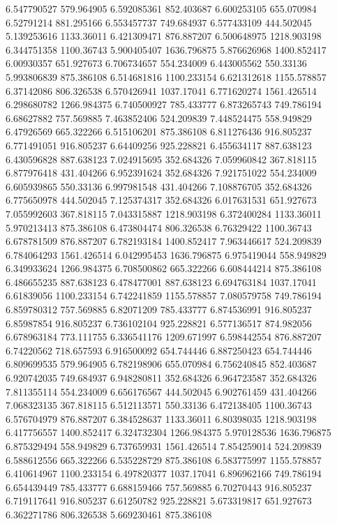 6.547790527	579.964905
6.592085361	852.403687
6.600253105	655.070984
6.52791214	881.295166
6.553457737	749.684937
6.577433109	444.502045
5.139253616	1133.36011
6.421309471	876.887207
6.500648975	1218.903198
6.344751358	1100.36743
5.900405407	1636.796875
5.876626968	1400.852417
6.00930357	651.927673
6.706734657	554.234009
6.443005562	550.33136
5.993806839	875.386108
6.514681816	1100.233154
6.621312618	1155.578857
6.37142086	806.326538
6.570426941	1037.17041
6.771620274	1561.426514
6.298680782	1266.984375
6.740500927	785.433777
6.873265743	749.786194
6.68627882	757.569885
7.463852406	524.209839
7.448524475	558.949829
6.47926569	665.322266
6.515106201	875.386108
6.811276436	916.805237
6.771491051	916.805237
6.64409256	925.228821
6.455634117	887.638123
6.430596828	887.638123
7.024915695	352.684326
7.059960842	367.818115
6.877976418	431.404266
6.952391624	352.684326
7.921751022	554.234009
6.605939865	550.33136
6.997981548	431.404266
7.108876705	352.684326
6.775650978	444.502045
7.125374317	352.684326
6.017631531	651.927673
7.055992603	367.818115
7.043315887	1218.903198
6.372400284	1133.36011
5.970213413	875.386108
6.473804474	806.326538
6.76329422	1100.36743
6.678781509	876.887207
6.782193184	1400.852417
7.963446617	524.209839
6.784064293	1561.426514
6.042995453	1636.796875
6.975419044	558.949829
6.349933624	1266.984375
6.708500862	665.322266
6.608444214	875.386108
6.486655235	887.638123
6.478477001	887.638123
6.694763184	1037.17041
6.61839056	1100.233154
6.742241859	1155.578857
7.080579758	749.786194
6.859780312	757.569885
6.82071209	785.433777
6.874536991	916.805237
6.85987854	916.805237
6.736102104	925.228821
6.577136517	874.982056
6.678963184	773.111755
6.336541176	1209.671997
6.598442554	876.887207
6.74220562	718.657593
6.916500092	654.744446
6.887250423	654.744446
6.809699535	579.964905
6.782198906	655.070984
6.756240845	852.403687
6.920742035	749.684937
6.948280811	352.684326
6.964723587	352.684326
7.811355114	554.234009
6.656176567	444.502045
6.902761459	431.404266
7.068323135	367.818115
6.512113571	550.33136
6.472138405	1100.36743
6.576704979	876.887207
6.384528637	1133.36011
6.80398035	1218.903198
6.417756557	1400.852417
6.324732304	1266.984375
5.970128536	1636.796875
6.875329494	558.949829
6.737659931	1561.426514
7.854259014	524.209839
6.588612556	665.322266
6.535228729	875.386108
6.583775997	1155.578857
6.410614967	1100.233154
6.497820377	1037.17041
6.896962166	749.786194
6.654439449	785.433777
6.688159466	757.569885
6.70270443	916.805237
6.719117641	916.805237
6.61250782	925.228821
5.673319817	651.927673
6.362271786	806.326538
5.669230461	875.386108
